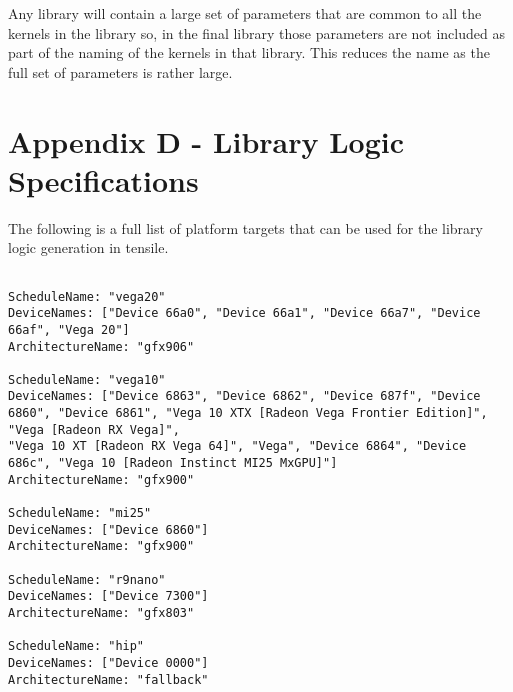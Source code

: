 \documentclass[]{article}
\begin{document}
Any library will contain a large set of parameters that are common to all the kernels in the library so, in the final library those parameters are not included as part of the naming of the kernels in that library. This reduces the name as the full set of parameters is rather large.

\section{Appendix D - Library Logic Specifications}
\label{sec:appendixD}

The following is a full list of platform targets that can be used for the library logic generation in tensile.

\begin{verbatim}

ScheduleName: "vega20"
DeviceNames: ["Device 66a0", "Device 66a1", "Device 66a7", "Device 66af", "Vega 20"]
ArchitectureName: "gfx906"

ScheduleName: "vega10"
DeviceNames: ["Device 6863", "Device 6862", "Device 687f", "Device 6860", "Device 6861", "Vega 10 XTX [Radeon Vega Frontier Edition]", "Vega [Radeon RX Vega]",
"Vega 10 XT [Radeon RX Vega 64]", "Vega", "Device 6864", "Device 686c", "Vega 10 [Radeon Instinct MI25 MxGPU]"]
ArchitectureName: "gfx900"

ScheduleName: "mi25"
DeviceNames: ["Device 6860"]
ArchitectureName: "gfx900"

ScheduleName: "r9nano"
DeviceNames: ["Device 7300"]
ArchitectureName: "gfx803"

ScheduleName: "hip"
DeviceNames: ["Device 0000"]
ArchitectureName: "fallback"

\end{verbatim}
\end{document}
